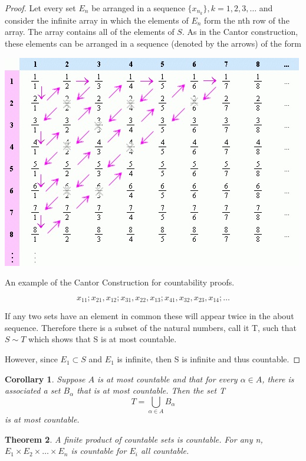 \documentclass{tufte-book}
\newtheorem{theorem}{Theorem}[chapter]
\newtheorem{corollary}[theorem]{Corollary}
\theoremstyle{definition}
\numberwithin{section}{chapter}
\begin{document}
\begin{proof}
Let every set $E_{n}$ be arranged in a sequence $\{x_{n_k}\}, k = 1,2,3, \ldots$ and consider the infinite array in which the elements of $E_n$ form the nth row of the array.  The array contains all of the elements of $S$.  As in the Cantor construction, these elements can be arranged in a sequence (denoted by the arrows) of the form  
\begin{marginfigure}
  \includegraphics{rationals-countable.jpg}
  \caption{An example of the Cantor Construction for countability proofs.}
\end{marginfigure}

\[x_{11}; x_{21}, x_{12}; x_{31}, x_{22}, x_{13}; x_{41}, x_{32}, x_{23}, x_{14}; \ldots\]

If any two sets have an element in common these will appear twice in the about sequence.  Therefore there is a subset of the natural numbers, call it T, such that $S \sim T$ which shows that S is at most countable.

However, since $E_{1}\subset S$ and $E_{1}$ is infinite, then S is infinite and thus countable.
\end{proof}

\begin{corollary} Suppose $A$ is at most countable and that for every $\alpha \in A$, there is associated a set $B_{\alpha}$ that is at most countable.  Then the set T
\[T = \bigcup_{\alpha \in A} B_{\alpha}\]
is at most countable. \end{corollary}



\begin{theorem}  A \emph{finite} product of countable sets is countable.  For any n,  $E_{1} \times E_{2} \times \ldots \times E_{n}$ is countable for $E_{i}$ all countable. \end{theorem}
\end{document}
